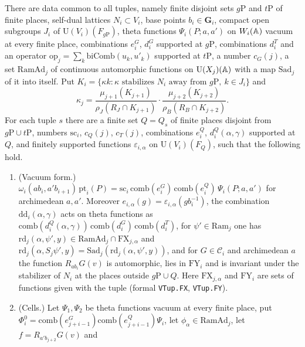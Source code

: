 \begin{hypothesis}\label{w3s:hyp:loc}
There are data common to all tuples, namely finite disjoint sets $g\mathrm P$ and $t\mathrm P$ of finite places, self-dual lattices $N_i\subset V_i$, base points $b_i\in\mathbf G_i$, compact open subgroups $J_i$ of $\mathrm U(V_i)(F_{g\mathrm P})$, theta functions $\Psi_i(P;a,a')$ on $W_i(\mathbb A)$ vacuum at every finite place, combinations $e^G_i$, $d^G_i$ supported at $g\mathrm P$, combinations $d^T_i$ and an operator $\mathrm{op}_j=\sum_k\mathrm{biComb}(u_k,u'_k)$ supported at $t\mathrm P$, a number $c_G(j)$, a set $\mathrm{RamAd}_j$ of continuous automorphic functions on $\mathrm U(X_j)(\mathbb A)$ with a map $\mathrm{Sad}_j$ of it into itself. Put $K_i=\{\kappa k:\kappa\text{ stabilizes }N_i\text{ away from }g\mathrm P,\ k\in J_i\}$ and
\[
\kappa_j=\frac{\mu_{j+1}(K_{j+1})}{\rho_J(R_J\cap K_{j+1})}\cdot\frac{\mu_{j+2}(K_{j+2})}{\rho_B(R_B\cap K_{j+2})} .
\]
For each tuple $s$ there are a finite set $Q=Q_s$ of finite places disjoint from $g\mathrm P\cup t\mathrm P$, numbers $\mathrm{sc}_i$, $c_Q(j)$, $c_T(j)$, combinations $e^Q_i$, $d^Q_i(\alpha,\gamma)$ supported at $Q$, and finitely supported functions $\varepsilon_{i,\alpha}$ on $\mathrm U(V_i)(F_Q)$, such that the following hold.
\begin{enumerate}[label=(L\arabic*),leftmargin=*]
\item\label{w3s:L1} (Vacuum form.) $\omega_i(ab_i,a'b_{i+1})\,\mathrm{pt}_i(P)=\mathrm{sc}_i\,\mathrm{comb}(e^G_i)\,\mathrm{comb}(e^Q_i)\,\Psi_i(P;a,a')$ for archimedean $a,a'$. Moreover $e_{i,\alpha}(g)=\varepsilon_{i,\alpha}(gb_i^{-1})$, the combination $\mathrm{dd}_i(\alpha,\gamma)$ acts on theta functions as $\mathrm{comb}(d^Q_i(\alpha,\gamma))\,\mathrm{comb}(d^G_i)\,\mathrm{comb}(d^T_i)$, for $\psi'\in\mathrm{Ram}_j$ one has $\mathrm{rd}_j(\alpha,\psi',y)\in\mathrm{RamAd}_j\cap\mathrm{FX}_{j,\alpha}$ and $\mathrm{rd}_j(\alpha,S_j\psi',y)=\mathrm{Sad}_j(\mathrm{rd}_j(\alpha,\psi',y))$, and for $G\in\mathcal C_i$ and archimedean $a$ the function $R_{ab_i}G(v)$ is automorphic, lies in $\mathrm{FY}_i$ and is invariant under the stabilizer of $N_i$ at the places outside $g\mathrm P\cup Q$. Here $\mathrm{FX}_{j,\alpha}$ and $\mathrm{FY}_i$ are sets of functions given with the tuple (formal \texttt{VTup.FX}, \texttt{VTup.FY}).
\item\label{w3s:L2} (Cells.) Let $\Psi_1,\Psi_2$ be theta functions vacuum at every finite place, put $\Phi^0_i=\mathrm{comb}(e^G_{j+i-1})\mathrm{comb}(e^Q_{j+i-1})\Psi_i$, let $\phi_\alpha\in\mathrm{RamAd}_j$, let $f=R_{a'b_{j+2}}G(v)$ and

\end{enumerate}
\end{hypothesis}
